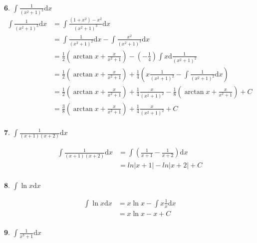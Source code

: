 \paragraph{}
\textbf{6}. $\int \frac{1}{(x^2 + 1)^3} \mathrm{d} x $ 
\begin{align*}
\int \frac{1}{(x^2 + 1)^3} \mathrm{d} x & = \int \frac{(1 + x^2) - x^2}{(x^2 + 1)^3} \mathrm{d} x \\
& =  \int  \frac{1}{(x^2 + 1)^2} \mathrm{d} x  - \int \frac{x^2}{(x^2 + 1)^3} \mathrm{d} x \\
& = \frac{1}{2} (\arctan{x} + \frac{x}{x^2 + 1}) - (- \frac{1}{4}) \int x  \mathrm{d} \frac{1}{(x^2 + 1)^2} \\
& =  \frac{1}{2} (\arctan{x} + \frac{x}{x^2 + 1}) + \frac{1}{4} ( x \frac{1}{(x^2 + 1)^2} - \int \frac{1}{(x^2 + 1)^2} \mathrm{d} x) \\
& =  \frac{1}{2} (\arctan{x} + \frac{x}{x^2 + 1}) + \frac{1}{4} \frac{x}{(x^2 + 1)^2} - \frac{1}{8} (\arctan{x} + \frac{x}{x^2 + 1}) + C\\
& = \frac{3}{8}  (\arctan{x} + \frac{x}{x^2 + 1}) + \frac{1}{4} \frac{x}{(x^2 + 1)^2} + C
\end{align*}


\paragraph{}
\textbf{7}. $\int \frac{1}{(x + 1)(x + 2)} \mathrm{d} x $ 

\begin{align*}
\int \frac{1}{(x + 1)(x + 2)} \mathrm{d} x  & = \int (\frac{1}{x+1} - \frac{1}{x+2}) \mathrm{d} x \\
& = ln|x+1| - ln|x+2| + C
\end{align*}

\paragraph{}
\textbf{8}. $\int \ln{x} \mathrm{d} x $ 

\begin{align*}
\int \ln{x} \mathrm{d} x  & = x  \ln{x} - \int x \frac{1}{x} \mathrm{d} x \\
& = x \ln{x} - x + C
\end{align*}

\paragraph{}
\textbf{9}. $\int \frac{1}{x^3 + 1} \mathrm{d} x $ 

